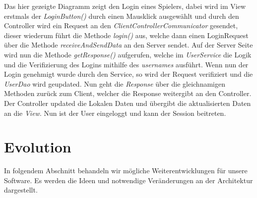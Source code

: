 \documentclass[fontsize=12pt,paper=a4,twoside]{scrartcl}
\begin{document}
Das hier gezeigte Diagramm zeigt den Login eines Spielers, dabei wird im View erstmals der \textit{LoginButton()} durch einen Mausklick ausgewählt und durch den Controller wird ein Request an den \textit{ClientControllerCommunicator} gesendet, dieser wiederum führt die Methode \textit{login()} aus, welche dann einen LoginRequest über die Methode \textit{receiveAndSendData} an den Server sendet. Auf der Server Seite wird nun die Methode \textit{getResponse()} aufgerufen, welche im \textit{UserService} die Logik und die Verifizierung des Logins mithilfe des \textit{usernames} ausführt. Wenn nun der Login genehmigt wurde durch den Service, so wird der Request verifiziert und die \textit{UserDao} wird geupdated. Nun geht die \textit{Response} über die gleichnamigen Methoden zurück zum Client, welcher die Response weitergibt an den Controller. Der Controller updated die Lokalen Daten und übergibt die aktualisierten Daten an die \textit{View}. Nun ist der User eingeloggt und kann der Session beitreten.


\section{Evolution} \label{sec:evolution}


In folgendem Abschnitt behandeln wir mögliche Weiterentwicklungen für unsere Software. Es werden die Ideen und notwendige Veränderungen an der Architektur dargestellt.
\end{document}
